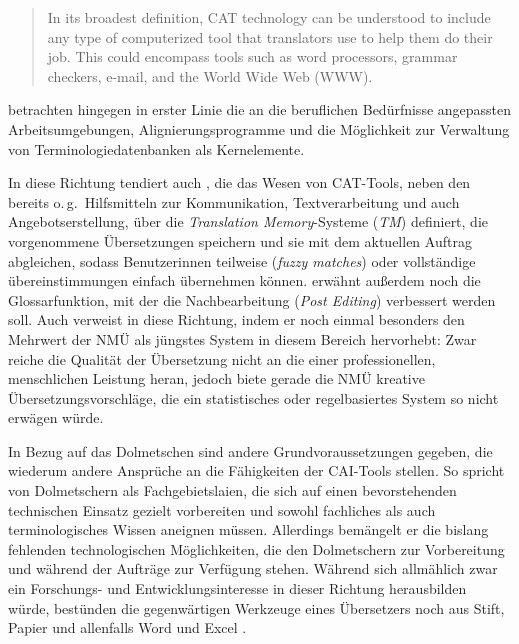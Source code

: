\begin{quote}
In its broadest definition, CAT technology can be understood to include any type of computerized tool that translators use to help them do their job. This could encompass tools such as word processors, grammar checkers, e-mail, and the World Wide Web (WWW). \citep[6]{bowker_computer-aided_2002}
\end{quote}


\citet[655]{carstensen_computerlinguistik_2010} betrachten hingegen in erster Linie die an die beruflichen Bedürfnisse angepassten Arbeitsumgebungen, Alignierungsprogramme und die Möglichkeit zur Verwaltung von Terminologiedatenbanken als Kernelemente.

\begin{sloppypar}
In diese Richtung tendiert auch \citet[1]{seewald-heeg_einsatz_2005}, die das Wesen von CAT-Tools, neben den bereits o.\,g.\ Hilfsmitteln zur Kommunikation, Textverarbeitung und auch Angebotserstellung, über die \emph{Translation Memory}-Systeme (\emph{TM}) definiert, die vorgenommene Übersetzungen speichern und sie mit dem aktuellen Auftrag abgleichen, sodass Benutzer{\textperiodcentered}innen teilweise (\emph{fuzzy matches}) oder vollständige übereinstimmungen einfach übernehmen können. \citet[246]{zimmermann_maschinelle_2012} erwähnt außerdem noch die Glossarfunktion, mit der die Nachbearbeitung (\emph{Post Editing}) verbessert werden soll. Auch \citet[21\psq]{koehn_neural_2020} verweist in diese Richtung, indem er noch einmal besonders den Mehrwert der NMÜ als jüngstes System in diesem Bereich hervorhebt: Zwar reiche die Qualität der Übersetzung nicht an die einer professionellen, menschlichen Leistung heran, jedoch biete gerade die NMÜ kreative Übersetzungsvorschläge, die ein statistisches oder regelbasiertes System so nicht erwägen würde.
\end{sloppypar}

In Bezug auf das Dolmetschen sind andere Grundvoraussetzungen gegeben, die wiederum andere Ansprüche an die Fähigkeiten der CAI-Tools stellen. So spricht \citet[411]{fantinuoli_interpretbank:_2009} von Dolmetschern als Fachgebietslaien, die sich \glqq auf einen bevorstehenden technischen Einsatz gezielt vorbereiten und sowohl fachliches als auch terminologisches Wissen aneignen\grqq{} müssen. Allerdings bemängelt er die bislang fehlenden technologischen Möglichkeiten, die den Dolmetschern zur Vorbereitung und während der Aufträge zur Verfügung stehen. Während sich allmählich zwar ein Forschungs- und Entwicklungsinteresse in dieser Richtung herausbilden würde, bestünden die gegenwärtigen Werkzeuge eines Übersetzers noch aus Stift, Papier und allenfalls Word und Excel \citep[2]{fantinuoli_interpretbank:_2009}.

